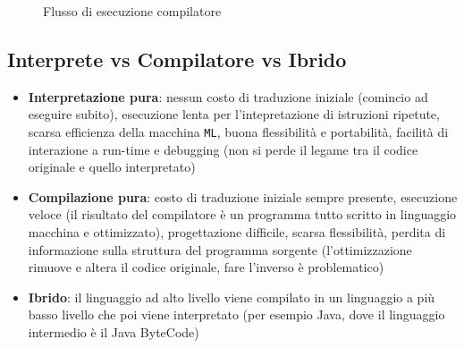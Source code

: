 \documentclass[12pt,a4paper]{article}
\begin{document}
\begin{figure}[h!]
	\begin{center}
	  \caption{Flusso di esecuzione compilatore}
	\end{center}
\end{figure}

\clearpage

\subsection{Interprete vs Compilatore vs Ibrido}
\begin{itemize}
 \item \textbf{Interpretazione pura}: nessun costo di traduzione iniziale (comincio ad eseguire subito), esecuzione lenta per l'intepretazione di istruzioni ripetute, scarsa efficienza della macchina \texttt{ML}, buona flessibilità e portabilità, facilità di interazione a run-time e debugging (non si perde il legame tra il codice originale e quello interpretato)

 \item \textbf{Compilazione pura}: costo di traduzione iniziale sempre presente, esecuzione veloce (il risultato del compilatore è un programma tutto scritto in linguaggio macchina e ottimizzato), progettazione difficile, scarsa flessibilità, perdita di
informazione sulla struttura del programma sorgente (l'ottimizzazione rimuove e altera il codice originale, fare l'inverso è problematico)

 \item \textbf{Ibrido}: il linguaggio ad alto livello viene compilato in un linguaggio a più basso livello che poi viene interpretato (per esempio Java, dove il linguaggio intermedio è il Java ByteCode)
\end{itemize}
\end{document}
